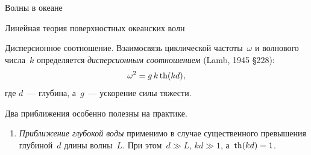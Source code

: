 \begin{chapter}{Волны в океане}
\begin{section}{Линейная теория поверхностных океанских волн}
\begin{paragraph}{Дисперсионное соотношение.}
%
Взаимосвязь циклической частоты~$\omega$ 
и волнового числа~$k$ определяется
\emph{дисперсионным соотношением} (Lamb, 1945 \S{228}):
\begin{equation}\label{eq:16.3}
 \omega ^{2} = g \, k \mathop{\mathrm{th}}\nolimits (k d),
\end{equation}
где $d$~--- глубина, а~$g$~--- ускорение силы тяжести.
%

Два приближения особенно полезны на практике.
%
\begin{enumerate}
\item \emph{Приближение глубокой воды} применимо в случае существенного
превышения глубиной~$d$ длины волны~$L$. При этом~$d \gg L$,
$kd \gg 1$, а~$\mathop{\mathrm{th}}\nolimits (kd) = 1$.
%


\end{enumerate}
\end{paragraph}
\end{section}
\end{chapter}

